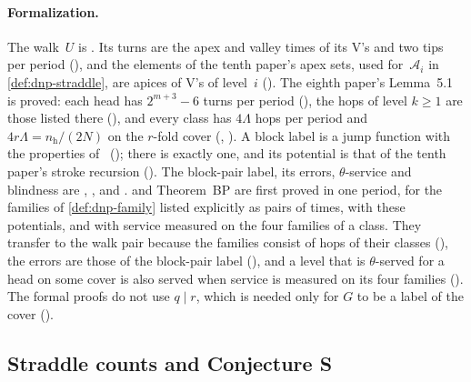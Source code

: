 \paragraph{Formalization.} The walk~$U$ is . Its turns are the apex and valley times of its V's
and two tips per period (), and the elements of the tenth paper's apex sets, used
for~$\mathcal A_i$ in \cref{def:dnp-straddle}, are apices of V's of level~$i$ (). The eighth
paper's Lemma~5.1 is proved: each head has $2^{m+3}-6$ turns per period (), the hops of
level $k\ge1$ are those listed there (), and every class has $4\Lambda$ hops per
period and $4r\Lambda=n_{\mathrm h}/(2N)$ on the $r$-fold cover (,
). A block label is a jump function with the properties
of~\cite[Definition~5.11]{BoundedNesting2026} (); there is exactly one, and its potential is
that of the tenth paper's stroke recursion (). The block-pair label, its
errors, $\theta$-service and blindness are , ,
 and .  and
Theorem~BP are first proved in one period, for the families of \cref{def:dnp-family} listed explicitly as pairs of times,
with these potentials, and with service measured on the four families of a class. They transfer to the walk pair because
the families consist of hops of their classes (), the errors are those of the
block-pair label (), and a level that is $\theta$-served for a head on some cover
is also served when service is measured on its four families (). The formal
proofs do not use $q\mid r$, which is needed only for $G$ to be a label of the cover
().

\subsection{Straddle counts and Conjecture S}\label{sec:dnp-S}

